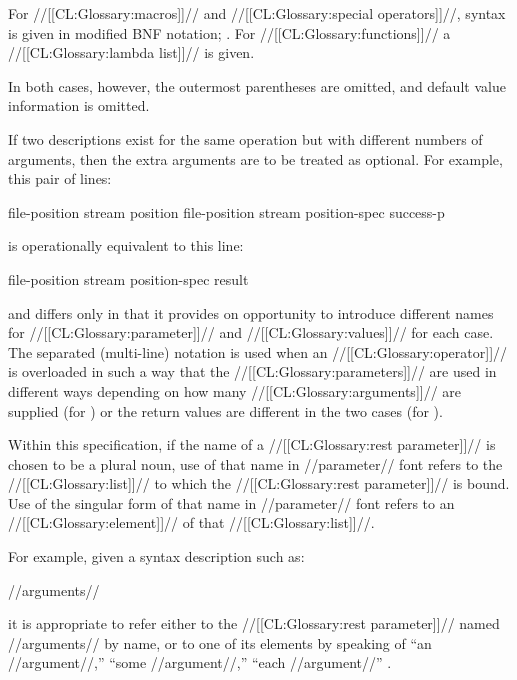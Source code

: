 For //[[CL:Glossary:macros]]// and //[[CL:Glossary:special operators]]//, syntax is given 
in modified BNF notation; \seesection\ModifiedBNF.
For //[[CL:Glossary:functions]]// a //[[CL:Glossary:lambda list]]// is given.

In both cases, however, the outermost parentheses are omitted,
and default value information is omitted.



If two descriptions exist for the same operation but with different numbers of
arguments, then the extra arguments are to be treated as optional.  For example,
this pair of lines:

\DefunWithValues file-position {stream} {position}
\DefunWithValues file-position {stream position-spec} {success-p}

\noindent is operationally equivalent to this line:

\DefunWithValues file-position {stream {\opt} position-spec} {result}

\noindent and differs only in that it provides on opportunity to introduce different
names for //[[CL:Glossary:parameter]]// and //[[CL:Glossary:values]]// for each case.
The separated (multi-line) notation is used when an //[[CL:Glossary:operator]]// is overloaded in
such a way that the //[[CL:Glossary:parameters]]// are used in different ways
depending on how many //[[CL:Glossary:arguments]]// are supplied (\eg for \thefunction{/})
or the return values are different in the two cases (\eg for ).

\endsubsubsubsection%


Within this specification, 
if the name of a //[[CL:Glossary:rest parameter]]// is chosen to be a plural noun,
use of that name in //parameter// font refers
to the //[[CL:Glossary:list]]// to which the //[[CL:Glossary:rest parameter]]// is bound.
Use of the singular form of that name in //parameter// font refers 
to an //[[CL:Glossary:element]]// of that //[[CL:Glossary:list]]//.

For example, given a syntax description such as:

 {{\rest} //arguments//}

\noindent it is appropriate to refer either to the //[[CL:Glossary:rest parameter]]// named
//arguments// by name, or to one of its elements by speaking of ``an //argument//,''
``some //argument//,'' ``each //argument//'' \etc.

